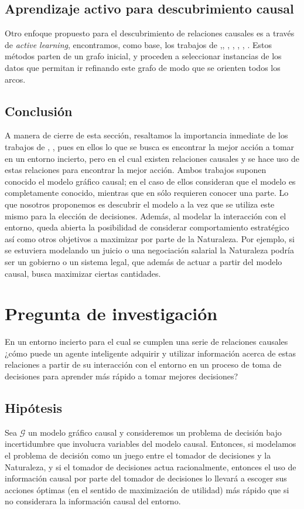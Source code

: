 \documentclass[11pt]{article}
\theoremstyle{plain}
\begin{document}
\subsection{Aprendizaje activo para descubrimiento causal}
Otro enfoque propuesto para el descubrimiento de relaciones causales es a través de \textit{active learning}, encontramos, como base, los trabajos de \cite{tong2001active},\cite{murphy2001active}, \cite{meganck2006learning}, \cite{he2008active}, \cite{hauser2012two}, \cite{10.1007/978-3-319-56970-3_9}, \cite{rubenstein2017probabilistic}. Estos métodos parten de un grafo inicial, y proceden a seleccionar instancias de los datos que permitan ir refinando este grafo de modo que se orienten todos los arcos.\\
\subsection{Conclusión}
A manera de cierre de esta sección, resaltamos la importancia inmediate de los trabajos de \cite{lattimoreNIPS2016}, \cite{sen2017identifying}, pues en ellos lo que se busca es encontrar la mejor acción a tomar en un entorno incierto, pero en el cual existen relaciones causales y se hace uso de estas relaciones para encontrar la mejor acción. Ambos trabajos suponen conocido el modelo gráfico causal; en el caso de \cite{lattimoreNIPS2016} ellos consideran que el modelo es completamente conocido, mientras que en \cite{sen2017identifying} sólo requieren conocer una parte. Lo que nosotros proponemos es descubrir el modelo a la vez que se utiliza este mismo para la elección de decisiones. Además, al modelar la interacción con el entorno, queda abierta la posibilidad de considerar comportamiento estratégico así como otros objetivos a maximizar por parte de la Naturaleza. Por ejemplo, si se estuviera modelando un juicio o  una negociación salarial la Naturaleza podría ser un gobierno o un sistema legal, que además de actuar a partir del modelo causal, busca maximizar ciertas cantidades.

\section{Pregunta de investigación}
En un entorno incierto para el cual se cumplen una serie de relaciones causales ¿cómo puede un agente inteligente adquirir y utilizar información acerca de estas relaciones a partir de su interacción con el entorno en un proceso de toma de decisiones para aprender más rápido a tomar mejores decisiones?
\subsection{Hipótesis}
Sea $\mathcal{G}$ un modelo gráfico causal y consideremos un problema de decisión bajo incertidumbre que involucra variables del modelo causal. Entonces, si modelamos el problema de decisión como un juego entre el tomador de decisiones y la Naturaleza, y si el tomador de decisiones actua racionalmente, entonces el uso de información causal por parte del tomador de decisiones lo llevará a escoger sus acciones óptimas (en el sentido de maximización de utilidad) más rápido que si no considerara la información causal del entorno.
\end{document}
